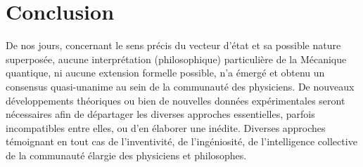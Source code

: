 \section{Conclusion}
De nos jours, concernant le sens précis du vecteur d’état et sa possible nature superposée,
aucune interprétation (philosophique) particulière de la Mécanique quantique, ni aucune
extension formelle possible, n’a émergé et obtenu un consensus quasi-unanime au sein de la
communauté des physiciens. De nouveaux développements théoriques ou bien de nouvelles
données expérimentales seront nécessaires afin de départager les diverses approches
essentielles, parfois incompatibles entre elles, ou d’en élaborer une inédite. Diverses
approches témoignant en tout cas de l’inventivité, de l’ingéniosité, de l’intelligence
collective de la communauté élargie des physiciens et philosophes.
